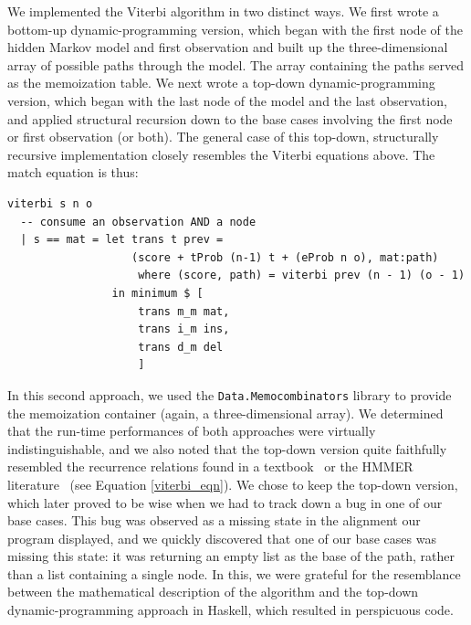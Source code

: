 \documentclass[preprint,nonatbib,blockstyle,nocopyrightspace,times]{sigplanconf}
\let\cite\citep
\begin{document}
We implemented the Viterbi algorithm in two distinct ways.
We first wrote a 
bottom-up dynamic-programming version, which began with the first node of the 
hidden Markov model and first observation and built up the three-dimensional 
array of possible paths through the model.
The array containing the paths 
served as the memoization table.
We next wrote a top-down dynamic-programming 
version, which began with the last node of the model and the last observation, 
and applied structural recursion down to the base cases involving the first 
node or first observation (or both).
The general case of this top-down, structurally recursive implementation closely
resembles the Viterbi equations above.
The match equation is thus:
\begin{verbatim}
viterbi s n o
  -- consume an observation AND a node
  | s == mat = let trans t prev = 
                   (score + tProb (n-1) t + (eProb n o), mat:path)
                    where (score, path) = viterbi prev (n - 1) (o - 1)
                in minimum $ [
                    trans m_m mat,
                    trans i_m ins,
                    trans d_m del
                    ]
\end{verbatim}

In this second approach, we used the 
\texttt{Data.Memocombinators} library to provide the memoization container 
(again, a three-dimensional array).
We determined that the run-time 
performances of both approaches were virtually indistinguishable, and we also 
noted that the top-down version quite faithfully resembled the recurrence 
relations found in a textbook~\cite{Durbin:1998wz} or the HMMER literature~\cite{Eddy:1998ut} 
(see Equation \ref{viterbi_eqn}).
We chose to keep the top-down version, which 
later proved to be wise when we had to track down a bug in one of our base 
cases.
This bug was observed as a missing state in the alignment our program 
displayed, and we quickly discovered that one of our base cases was missing 
this state: it was returning an empty list as the base of the path, rather than 
a list containing a single node.
In this, we were grateful for the resemblance 
between the mathematical description of the algorithm and the top-down 
dynamic-programming approach in Haskell, which resulted in perspicuous code.
\end{document}
